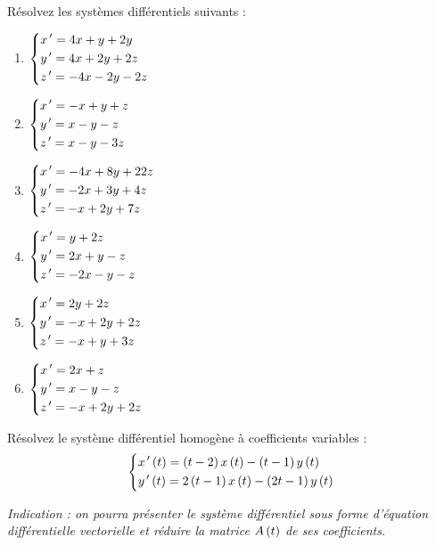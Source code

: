 \begin{exoss}
Résolvez les systèmes différentiels suivants :

\begin{enumerate}
    \item \(\begin{dcases}
        x^{\,\prime}=4x+y+2y \\
        y^{\,\prime}=4x+2y+2z \\
        z^{\,\prime}=-4x-2y-2z
    \end{dcases}\) \\
    \item \(\begin{dcases}
        x^{\,\prime}=-x+y+z \\
        y^{\,\prime}=x-y-z \\
        z^{\,\prime}=x-y-3z
    \end{dcases}\) \\
    \item \(\begin{dcases}
        x^{\,\prime}=-4x+8y+22z \\
        y^{\,\prime}=-2x+3y+4z \\
        z^{\,\prime}=-x+2y+7z
    \end{dcases}\) \\
    \item \(\begin{dcases}
        x^{\,\prime}=y+2z \\
        y^{\,\prime}=2x+y-z \\
        z^{\,\prime}=-2x-y-z
    \end{dcases}\) \\
    \item \(\begin{dcases}
        x^{\,\prime}=2y+2z \\
        y^{\,\prime}=-x+2y+2z \\
        z^{\,\prime}=-x+y+3z
    \end{dcases}\) \\
    \item \(\begin{dcases}
        x^{\,\prime}=2x+z \\
        y^{\,\prime}=x-y-z \\
        z^{\,\prime}=-x+2y+2z
    \end{dcases}\)
\end{enumerate}
\end{exoss}

\begin{exoss}
Résolvez le système différentiel homogène à coefficients variables : \[\begin{dcases}
x^{\,\prime}\left(t\right)=\left(t-2\right)x\left(t\right)-\left(t-1\right)y\left(t\right) \\
y^{\,\prime}\left(t\right)=2\left(t-1\right)x\left(t\right)-\left(2t-1\right)y\left(t\right)
\end{dcases}\]

\textit{Indication : on pourra présenter le système différentiel sous forme d'équation différentielle vectorielle et réduire la matrice \(A\left(t\right)\) de ses coefficients.}
\end{exoss}

